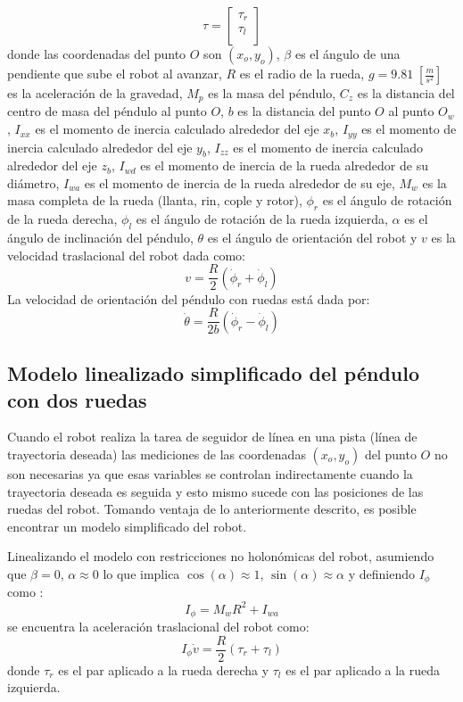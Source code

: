 \documentclass{article}
\begin{document}
\begin{equation}
    \tau= \begin{bmatrix}
        \tau_r \\
        \tau_l \\
    \end{bmatrix}
    \label{eq:18}
\end{equation}
donde las coordenadas del punto $O$ son $(x_o,y_o)$, $\beta$ es el ángulo de una pendiente que sube el robot al avanzar, $R$ es el radio de la rueda, $g=9.81\;[\frac{m}{s^2}]$ es la aceleración de la gravedad, $M_p$ es la masa del péndulo, $C_z$ es la distancia del centro de masa del péndulo al punto $O$, $b$ es la distancia del punto $O$ al punto $O_w$, $I_{xx}$ es el momento de inercia calculado alrededor del eje $x_b$, $I_{yy}$ es el momento de inercia calculado alrededor del eje $y_b$, $I_{zz}$ es el momento de inercia calculado alrededor del eje $z_b$, $I_{wd}$ es el momento de inercia de la rueda alrededor de su diámetro, $I_{wa}$ es el momento de inercia de la rueda alrededor de su eje, $M_w$ es la masa completa de la rueda (llanta, rin, cople y rotor), $\phi_r$ es el ángulo de rotación de la rueda derecha, $\phi_l$ es el ángulo de rotación de la rueda izquierda, $\alpha$ es el ángulo de inclinación del péndulo, $\theta$ es el ángulo de orientación del robot y $v$ es la velocidad traslacional del robot dada como:
\begin{equation}
    v=\frac{R}{2}(\dot\phi_r+\dot\phi_l)
    \label{eq:19}
\end{equation}
La velocidad de orientación del péndulo con ruedas está dada por:
\begin{equation}
    \dot{\theta}=\frac{R}{2b}(\dot\phi_r-\dot\phi_l)
    \label{eq:20}
\end{equation}
\subsection{Modelo linealizado simplificado del péndulo con dos ruedas}
Cuando el robot realiza la tarea de seguidor de línea en una pista (línea de trayectoria deseada) las mediciones de las coordenadas $(x_o,y_o)$ del punto $O$ no son necesarias ya que esas variables se controlan indirectamente cuando la trayectoria deseada es seguida y esto mismo sucede con las posiciones de las ruedas del robot. Tomando ventaja de lo anteriormente descrito, es posible encontrar un modelo simplificado del robot.

Linealizando el modelo con restricciones no holonómicas del robot, asumiendo que $\beta=0$, $\alpha\approx0$ lo que implica $\cos(\alpha)\approx1$, $\sin(\alpha)\approx\alpha$ y definiendo $I_\phi$ como \citep{HernandezBook2024}:
\begin{equation}
    I_\phi=M_wR^2+I_{wa}
    \label{eq:21}
\end{equation}
se encuentra la aceleración traslacional del robot como:
\begin{equation}
    \boxed{I_\phi\dot{v}=\frac{R}{2}(\tau_r+\tau_l)}
    \label{eq:22}
\end{equation}
donde $\tau_r$ es el par aplicado a la rueda derecha y $\tau_l$ es el par aplicado a la rueda izquierda.
\end{document}
